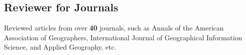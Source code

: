\documentclass[11pt, a4paper]{article}
\begin{document}
\subsection*{Reviewer for Journals}
Reviewed articles from over \textbf{40} journals, such as Annals of the American Association of Geographers, International Journal of Geographical Information Science, and Applied Geography, etc.
\end{document}
